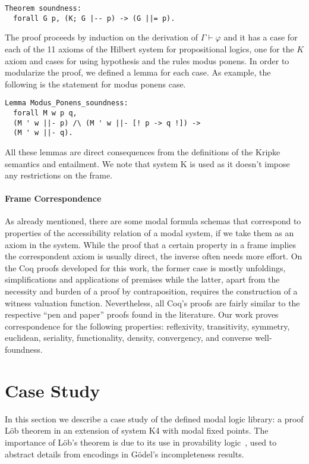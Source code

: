 \documentclass[sigconf]{acmart}
\begin{document}
\begin{verbatim}
Theorem soundness:
  forall G p, (K; G |-- p) -> (G ||= p).
\end{verbatim}

The proof proceeds by induction on the derivation of $\Gamma \vdash\varphi$ and
it has a case for each of the 11 axioms of the Hilbert system for propositional
logics, one for the $K$ axiom and cases for using hypothesis and the rules modus
ponens. In order to modularize the proof, we defined a lemma for each case.
As example, the following is the statement for modus ponens case.
\begin{verbatim}
Lemma Modus_Ponens_soundness:
  forall M w p q,
  (M ' w ||- p) /\ (M ' w ||- [! p -> q !]) ->
  (M ' w ||- q).
\end{verbatim}
All these lemmas are direct consequences from the definitions of the Kripke
semantics and entailment. We note that system K is used as it doesn't impose
any restrictions on the frame.

\paragraph{Frame Correspondence} 
As already mentioned, there are some modal formula schemas that correspond
to properties of the accessibility relation of a modal system, if we take them
as an axiom in the system.  While the proof that a certain property in a frame
implies the correspondent axiom is usually  direct, the inverse often needs
more effort. On the Coq proofs developed for this work,  the former case is
mostly unfoldings, simplifications and applications of premises
while the latter, apart from the necessity and burden of a proof by contraposition, 
requires the construction of a witness valuation function. 
Nevertheless, all Coq's proofs are fairly similar to the respective
``pen and paper'' proofs found in the literature. 
Our work proves correspondence for the following properties: reflexivity,
transitivity, symmetry,  euclidean, seriality, functionality, density, convergency,
and converse well-foundness.

\section{Case Study}\label{sec:case}

In this section we describe a case study of the defined modal logic library:
a proof L\"ob theorem in an extension of system K4 with modal fixed points.
The importance of L\"ob's theorem is due to its use in provability
logic~\cite{boolos_1994}, used to abstract details from encodings in G\"odel's
incompleteness results.
\end{document}
